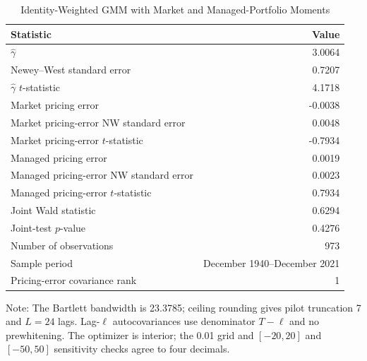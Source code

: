 \begin{table}[H]
  \centering
  \caption{Identity-Weighted GMM with Market and Managed-Portfolio Moments}
  \label{tab:3c-gmm}
  \begin{tabular}{lr}
    \toprule
    Statistic & Value \\
    \midrule
    $\hat{\gamma}$ & 3.0064 \\
    Newey--West standard error & 0.7207 \\
    $\hat{\gamma}$ $t$-statistic & 4.1718 \\
    Market pricing error & -0.0038 \\
    Market pricing-error NW standard error & 0.0048 \\
    Market pricing-error $t$-statistic & -0.7934 \\
    Managed pricing error & 0.0019 \\
    Managed pricing-error NW standard error & 0.0023 \\
    Managed pricing-error $t$-statistic & 0.7934 \\
    Joint Wald statistic & 0.6294 \\
    Joint-test $p$-value & 0.4276 \\
    Number of observations & 973 \\
    Sample period & December 1940--December 2021 \\
    Pricing-error covariance rank & 1 \\
    \bottomrule
  \end{tabular}
  \footnotesize{Note: The Bartlett bandwidth is 23.3785; ceiling rounding gives pilot truncation 7 and $L=24$ lags. Lag-$\ell$ autocovariances use denominator $T-\ell$ and no prewhitening. The optimizer is interior; the 0.01 grid and $[-20,20]$ and $[-50,50]$ sensitivity checks agree to four decimals.}
\end{table}

